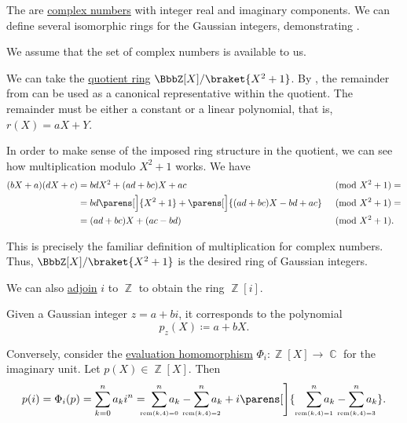 \begin{example}\label{ex:gaussian_integers}
  The  are \hyperref[def:complex_numbers]{complex numbers} with integer real and imaginary components. We can define several isomorphic rings for the Gaussian integers, demonstrating .

  We assume that the set of complex numbers is available to us.

  \begin{thmenum}
     We can take the \hyperref[def:ring/quotient]{quotient ring} \( \BbbZ[X] / \braket{X^2 + 1} \). By , the remainder from  can be used as a canonical representative within the quotient. The remainder must be either a constant or a linear polynomial, that is, \( r(X) = aX + Y \).

    In order to make sense of the imposed ring structure in the quotient, we can see how multiplication modulo \( X^2 + 1 \) works. We have
    \begin{align*}
      (bX + a) (dX + c)
      &=
      bdX^2 + (ad + bc)X + ac
      &\pmod {X^2 + 1} = \\ &=
      bd\parens[\Big]{ X^2 + 1 } + \parens[\Big]{ (ad + bc)X - bd + ac }
      &\pmod {X^2 + 1} = \\ &=
      (ad + bc)X + (ac - bd)
      &\pmod {X^2 + 1}. \phantom{=}
    \end{align*}

    This is precisely the familiar definition of multiplication for complex numbers. Thus, \( \BbbZ[X] / \braket{X^2 + 1} \) is the desired ring of Gaussian integers.

     We can also \hyperref[thm:adjoining_elements_to_semiring]{adjoin} \( i \) to \( \BbbZ \) to obtain the ring \( \BbbZ[i] \).

    Given a Gaussian integer \( z = a + bi \), it corresponds to the polynomial
    \begin{equation*}
      p_z(X) \coloneqq a + bX.
    \end{equation*}

    Conversely, consider the \hyperref[rem:substitution_homomorphism]{evaluation homomorphism} \( \Phi_i: \BbbZ[X] \to \BbbC \) for the imaginary unit. Let \( p(X) \in \BbbZ[X] \). Then
    \begin{equation*}
      p(i)
      =
      \Phi_i(p)
      =
      \sum_{k=0}^n a_k i^n
      =
      \thickspace \sum_{\scriptscriptstyle{\mathclap{\rem(k, 4) = 0}}}^n a_k - \sum_{\scriptscriptstyle{\mathclap{\rem(k, 4) = 2}}}^n a_k + i \parens[\Bigg]{ \quad \sum_{\scriptscriptstyle{\mathclap{\rem(k, 4) = 1}}}^n a_k - \sum_{\scriptscriptstyle{\mathclap{\rem(k, 4) = 3}}}^n a_k }.
    \end{equation*}


\end{thmenum}
\end{example}
